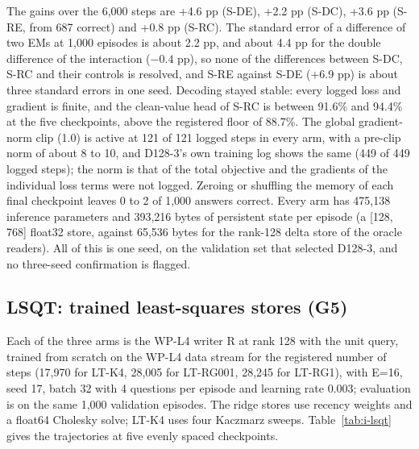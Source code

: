 The gains over the 6,000 steps are +4.6 pp (S-DE), +2.2 pp (S-DC), +3.6 pp (S-RE, from 687 correct) and +0.8 pp (S-RC).
The standard error of a difference of two EMs at 1,000 episodes is about 2.2 pp, and about 4.4 pp for the double difference of the interaction ($-0.4$ pp), so none of the differences between S-DC, S-RC and their controls is resolved, and S-RE against S-DE (+6.9 pp) is about three standard errors in one seed.  %
Decoding stayed stable: every logged loss and gradient is finite, and the clean-value head of S-RC is between 91.6\% and 94.4\% at the five checkpoints, above the registered floor of 88.7\%.  %
The global gradient-norm clip (1.0) is active at 121 of 121 logged steps in every arm, with a pre-clip norm of about 8 to 10, and D128-3's own training log shows the same (449 of 449 logged steps); the norm is that of the total objective and the gradients of the individual loss terms were not logged.  %
Zeroing or shuffling the memory of each final checkpoint leaves 0 to 2 of 1,000 answers correct.  %
Every arm has 475,138 inference parameters and 393,216 bytes of persistent state per episode (a [128, 768] float32 store, against 65,536 bytes for the rank-128 delta store of the oracle readers).  %
All of this is one seed, on the validation set that selected D128-3, and no three-seed confirmation is flagged.

\subsection{LSQT: trained least-squares stores (G5)}

Each of the three arms is the WP-L4 writer R at rank 128 with the unit query, trained from scratch on the WP-L4 data stream for the registered number of steps (17,970 for LT-K4, 28,005 for LT-RG001, 28,245 for LT-RG1), with E=16, seed 17, batch 32 with 4 questions per episode and learning rate 0.003; evaluation is on the same 1,000 validation episodes.
The ridge stores use recency weights and a float64 Cholesky solve; LT-K4 uses four Kaczmarz sweeps.
Table~\ref{tab:i-lsqt} gives the trajectories at five evenly spaced checkpoints.

